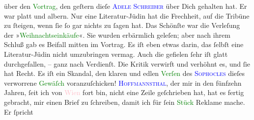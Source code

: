                über den \textcolor{green}{Vortrag}{}\ledrightnote{{$\rightarrow$}\textcolor{green}{[Vortrag über Arthur Schnitzler]}}, den geſtern dieſe \textsc{\textcolor{blue}{Adele Schreiber}{}\ledrightnote{\textcolor{blue}{Adele Schreiber}}} über Dich gehalten hat. Er war platt und albern. Nur eine Literatur-Jüdin hat
               die Frechheit, auf die Tribüne zu  ſteigen, wenn
               ſie ſo gar nichts zu ſagen hat. Das Schönſte war die Verleſung der »\textcolor{green}{Weihnachtseinkäufe}{}\ledrightnote{\textcolor{green}{Weihnachts-Einkäufe}}«. Sie wurden erbärmlich geleſen; aber {\pb}nach ihrem Schluß gab es Beifall mitten im Vortrag.
               Es iſt eben etwas darin, das ſelbſt eine Literatur-Jüdin nicht umzubringen vermag.
               Auch die \label{K_L02909-19v}\label{K_L02909-19h} gefielen ſehr{\dotsfour}\pend
           \pstart
           \label{K_L02909-3v}\label{K_L02909-3h} iſt glatt durchgefallen, – ganz nach Verdienſt. Die Kritik
               verwirft und verhöhnt es, und ſie hat Recht. Es iſt ein Skandal, den klaren und edlen
                  \textcolor{green}{Verſen}{}\ledrightnote{{$\rightarrow$}\textcolor{green}{Antigone}} des \textsc{\textcolor{blue}{Sophocles}{}\ledrightnote{\textcolor{blue}{Sophokles}}} dieſes verworrene \textcolor{green}{Gewäſch}{}\ledrightnote{{$\rightarrow$}\textcolor{green}{Vorspiel zur Antigone des Sophokles}} voranzuſchicken!\pend
           \pstart
           \textsc{\textcolor{blue}{Hoffmannsthal}{}\ledrightnote{\textcolor{blue}{Hugo von Hofmannsthal}}}, der mir in den fünfzehn Jahren, ſeit ich von \textcolor{pink}{Wien}{}\ledrightnote{\textcolor{pink}{Wien}} fort bin, nicht eine Zeile geſchrieben hat, hat es fertig gebracht, mir
                  {\pb}einen Brief zu ſchreiben, damit ich für ſein \textcolor{green}{Stück}{}\ledrightnote{{$\rightarrow$}\textcolor{green}{Vorspiel zur Antigone des Sophokles}} Reklame mache. Er ſpricht
